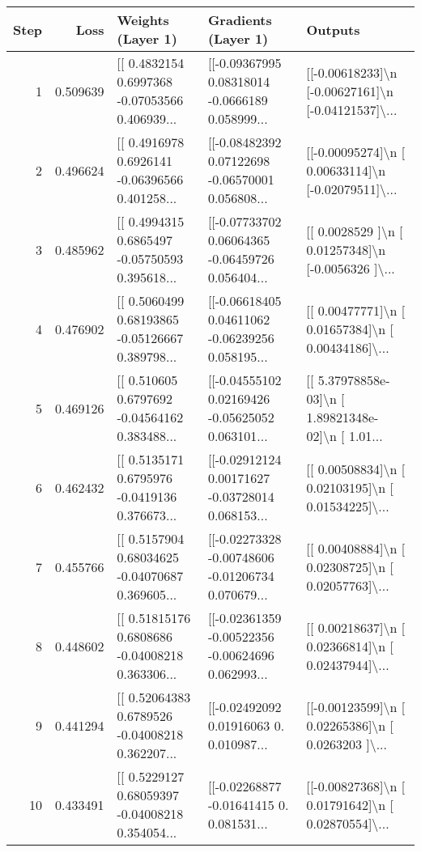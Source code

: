 \begin{tabular}{rrlll}
\toprule
 Step &     Loss &                                  Weights (Layer 1) &                                Gradients (Layer 1) &                                            Outputs \\
\midrule
    1 & 0.509639 & [[ 0.4832154   0.6997368  -0.07053566  0.406939... & [[-0.09367995  0.08318014 -0.0666189   0.058999... & [[-0.00618233]\textbackslash n [-0.00627161]\textbackslash n [-0.04121537]\textbackslash ... \\
    2 & 0.496624 & [[ 0.4916978   0.6926141  -0.06396566  0.401258... & [[-0.08482392  0.07122698 -0.06570001  0.056808... & [[-0.00095274]\textbackslash n [ 0.00633114]\textbackslash n [-0.02079511]\textbackslash ... \\
    3 & 0.485962 & [[ 0.4994315   0.6865497  -0.05750593  0.395618... & [[-0.07733702  0.06064365 -0.06459726  0.056404... & [[ 0.0028529 ]\textbackslash n [ 0.01257348]\textbackslash n [-0.0056326 ]\textbackslash ... \\
    4 & 0.476902 & [[ 0.5060499   0.68193865 -0.05126667  0.389798... & [[-0.06618405  0.04611062 -0.06239256  0.058195... & [[ 0.00477771]\textbackslash n [ 0.01657384]\textbackslash n [ 0.00434186]\textbackslash ... \\
    5 & 0.469126 & [[ 0.510605    0.6797692  -0.04564162  0.383488... & [[-0.04555102  0.02169426 -0.05625052  0.063101... & [[ 5.37978858e-03]\textbackslash n [ 1.89821348e-02]\textbackslash n [ 1.01... \\
    6 & 0.462432 & [[ 0.5135171   0.6795976  -0.0419136   0.376673... & [[-0.02912124  0.00171627 -0.03728014  0.068153... & [[ 0.00508834]\textbackslash n [ 0.02103195]\textbackslash n [ 0.01534225]\textbackslash ... \\
    7 & 0.455766 & [[ 0.5157904   0.68034625 -0.04070687  0.369605... & [[-0.02273328 -0.00748606 -0.01206734  0.070679... & [[ 0.00408884]\textbackslash n [ 0.02308725]\textbackslash n [ 0.02057763]\textbackslash ... \\
    8 & 0.448602 & [[ 0.51815176  0.6808686  -0.04008218  0.363306... & [[-0.02361359 -0.00522356 -0.00624696  0.062993... & [[ 0.00218637]\textbackslash n [ 0.02366814]\textbackslash n [ 0.02437944]\textbackslash ... \\
    9 & 0.441294 & [[ 0.52064383  0.6789526  -0.04008218  0.362207... & [[-0.02492092  0.01916063  0.          0.010987... & [[-0.00123599]\textbackslash n [ 0.02265386]\textbackslash n [ 0.0263203 ]\textbackslash ... \\
   10 & 0.433491 & [[ 0.5229127   0.68059397 -0.04008218  0.354054... & [[-0.02268877 -0.01641415  0.          0.081531... & [[-0.00827368]\textbackslash n [ 0.01791642]\textbackslash n [ 0.02870554]\textbackslash ... \\
\bottomrule
\end{tabular}
